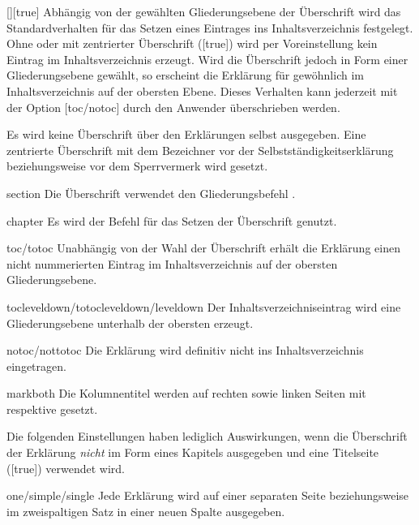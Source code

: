 \begin{Declaration}{[\PSet]}[true]
Abhängig von der gewählten Gliederungsebene der Überschrift wird das 
Standardverhalten für das Setzen eines Eintrages ins Inhaltsverzeichnis 
festgelegt. Ohne oder mit zentrierter Überschrift ([true]) 
wird per Voreinstellung kein Eintrag im Inhaltsverzeichnis erzeugt. Wird die 
Überschrift jedoch in Form einer Gliederungsebene gewählt, so erscheint die 
Erklärung für gewöhnlich im Inhaltsverzeichnis auf der obersten Ebene. Dieses 
Verhalten kann jederzeit mit der Option [toc/notoc] durch 
den Anwender überschrieben werden.
%
\begin{values}
\itemfalse
  Es wird keine Überschrift über den Erklärungen selbst ausgegeben.
\itemtrue*
  Eine zentrierte Überschrift mit dem Bezeichner  vor 
  der Selbstständigkeitserklärung beziehungsweise  vor dem 
  Sperrvermerk wird gesetzt. 
\item[section]
  Die Überschrift verwendet den Gliederungsbefehl .
\item[chapter]
  Es wird der Befehl  für das Setzen der Überschrift genutzt. 
\item[toc/totoc]
  Unabhängig von der Wahl der Überschrift erhält die Erklärung einen nicht
  nummerierten Eintrag im Inhaltsverzeichnis auf der obersten Gliederungsebene. 
\item[tocleveldown/totocleveldown/leveldown]
  Der Inhaltsverzeichniseintrag wird eine Gliederungsebene unterhalb der 
  obersten erzeugt.
\item[notoc/nottotoc]
  Die Erklärung wird definitiv nicht ins Inhaltsverzeichnis eingetragen.
\item[markboth]
  Die Kolumnentitel werden auf rechten sowie linken Seiten mit 
   respektive  gesetzt.
\end{values}
%
Die folgenden Einstellungen haben lediglich Auswirkungen, wenn die Überschrift 
der Erklärung \emph{nicht} im Form eines Kapitels ausgegeben und eine 
Titelseite ([true]) verwendet wird.
%
\begin{values}
\item[one/simple/single]Jede Erklärung wird auf einer separaten Seite
  beziehungsweise im zweispaltigen Satz in einer neuen Spalte ausgegeben.

\end{values}
\end{Declaration}

